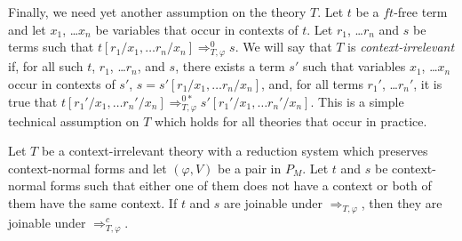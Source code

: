 \documentclass[reqno]{amsart}
\theoremstyle{definition}
\theoremstyle{remark}
\newcommand{\ft}{\mathit{ft}}
\numberwithin{figure}{section}
\begin{document}
Finally, we need yet another assumption on the theory $T$.
Let $t$ be a $\ft$-free term and let $x_1$, \ldots $x_n$ be variables that occur in contexts of $t$.
Let $r_1$, \ldots $r_n$ and $s$ be terms such that $t[r_1/x_1, \ldots r_n/x_n] \Rightarrow_{T,\varphi}^0 s$.
We will say that $T$ is \emph{context-irrelevant} if, for all such $t$, $r_1$, \ldots $r_n$, and $s$, there exists a term $s'$ such that variables $x_1$, \ldots $x_n$ occur in contexts of $s'$, $s = s'[r_1/x_1, \ldots r_n/x_n]$,
and, for all terms $r_1'$, \ldots $r_n'$, it is true that $t[r_1'/x_1, \ldots r_n'/x_n] \Rightarrow_{T,\varphi}^{0*} s'[r_1'/x_1, \ldots r_n'/x_n]$.
This is a simple technical assumption on $T$ which holds for all theories that occur in practice.

\begin{lem}[context]
Let $T$ be a context-irrelevant theory with a reduction system which preserves context-normal forms and let $(\varphi,V)$ be a pair in $P_M$.
Let $t$ and $s$ be context-normal forms such that either one of them does not have a context or both of them have the same context.
If $t$ and $s$ are joinable under $\Rightarrow_{T,\varphi}$, then they are joinable under $\Rightarrow_{T,\varphi}^c$.
\end{lem}
\end{document}
